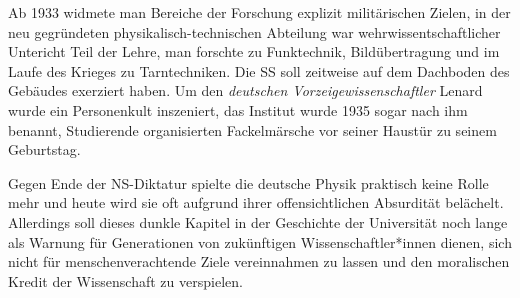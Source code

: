 Ab 1933 widmete man Bereiche der Forschung explizit militärischen Zielen, in der neu gegründeten physikalisch-technischen Abteilung war wehrwissentschaftlicher Untericht Teil der Lehre, man forschte zu Funktechnik, Bildübertragung und im Laufe des Krieges zu Tarntechniken. Die SS soll zeitweise auf dem Dachboden des Gebäudes exerziert haben.
Um den \textit{deutschen Vorzeigewissenschaftler} Lenard wurde ein Personenkult inszeniert, das Institut wurde 1935 sogar nach ihm benannt, Studierende organisierten Fackelmärsche vor seiner Haustür zu seinem Geburtstag. 

Gegen Ende der NS-Diktatur spielte die deutsche Physik praktisch keine Rolle mehr und heute wird sie oft aufgrund ihrer offensichtlichen Absurdität belächelt.\\ Allerdings soll dieses dunkle Kapitel in der Geschichte der Universität noch lange als Warnung für Generationen von zukünftigen Wissenschaftler*innen dienen, sich nicht für menschenverachtende Ziele vereinnahmen zu lassen und den moralischen Kredit der Wissenschaft zu verspielen.

